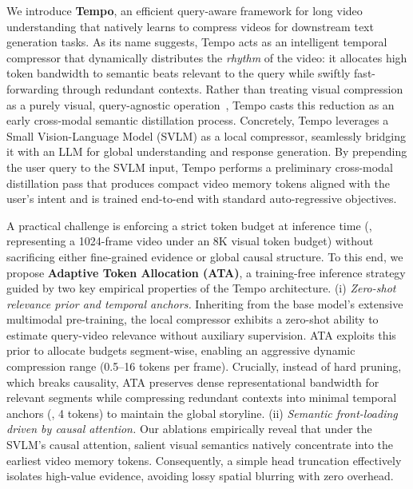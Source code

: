 We introduce \textbf{Tempo}, an efficient query-aware framework for long video understanding that natively learns to compress videos for downstream text generation tasks.
%
As its name suggests, Tempo acts as an intelligent temporal compressor that dynamically distributes the \emph{rhythm} of the video: it allocates high token bandwidth to semantic beats relevant to the query while swiftly fast-forwarding through redundant contexts.
%
Rather than treating visual compression as a purely visual, query-agnostic operation~\cite{jiang2025storm,li2024videochat}, Tempo casts this reduction as an early cross-modal semantic distillation process.
%
Concretely, Tempo leverages a Small Vision-Language Model (SVLM) as a local compressor, seamlessly bridging it with an LLM for global understanding and response generation.
%
By prepending the user query to the SVLM input, Tempo performs a preliminary cross-modal distillation pass that produces compact video memory tokens aligned with the user's intent and is trained end-to-end with standard auto-regressive objectives.


A practical challenge is enforcing a strict token budget at inference time (\eg, representing a 1024-frame video under an 8K visual token budget) without sacrificing either fine-grained evidence or global causal structure.
%
To this end, we propose \textbf{Adaptive Token Allocation (ATA)}, a training-free inference strategy guided by two key empirical properties of the Tempo architecture.
%
(i) \emph{Zero-shot relevance prior and temporal anchors.}
%
Inheriting from the base model's extensive multimodal pre-training, the local compressor exhibits a zero-shot ability to estimate query-video relevance without auxiliary supervision.
%
ATA exploits this prior to allocate budgets segment-wise, enabling an aggressive dynamic compression range (0.5--16 tokens per frame). Crucially, instead of hard pruning, which breaks causality, ATA preserves dense representational bandwidth for relevant segments while compressing redundant contexts into minimal temporal anchors (\ie, 4 tokens) to maintain the global storyline.
%
(ii) \emph{Semantic front-loading driven by causal attention.}
%
Our ablations empirically reveal that under the SVLM's causal attention, salient visual semantics natively concentrate into the earliest video memory tokens.
%
Consequently, a simple head truncation effectively isolates high-value evidence, avoiding lossy spatial blurring with zero overhead.

